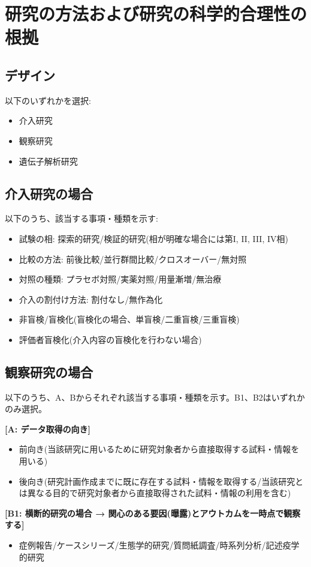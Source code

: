 \documentclass{kyodai-protocol}
\begin{document}
\section{研究の方法および研究の科学的合理性の根拠}
\label{sec:methods}

\subsection{デザイン}

以下のいずれかを選択:
\begin{itemize}
\item 介入研究
\item 観察研究
\item 遺伝子解析研究
\end{itemize}

\subsection{介入研究の場合}
以下のうち、該当する事項・種類を示す:
\begin{itemize}
\item 試験の相: 探索的研究/検証的研究(相が明確な場合には第I, II, III, IV相)
\item 比較の方法: 前後比較/並行群間比較/クロスオーバー/無対照
\item 対照の種類: プラセボ対照/実薬対照/用量漸増/無治療
\item 介入の割付け方法: 割付なし/無作為化
\item 非盲検/盲検化(盲検化の場合、単盲検/二重盲検/三重盲検)
\item 評価者盲検化(介入内容の盲検化を行わない場合)
\end{itemize}

\subsection{観察研究の場合}
以下のうち、A、Bからそれぞれ該当する事項・種類を示す。B1、B2はいずれかのみ選択。

\textbf{[A: データ取得の向き]}
\begin{itemize}
\item 前向き(当該研究に用いるために研究対象者から直接取得する試料・情報を用いる)
\item 後向き(研究計画作成までに既に存在する試料・情報を取得する/当該研究とは異なる目的で研究対象者から直接取得された試料・情報の利用を含む)
\end{itemize}

\textbf{[B1: 横断的研究の場合 → 関心のある要因(曝露)とアウトカムを一時点で観察する]}
\begin{itemize}
\item 症例報告/ケースシリーズ/生態学的研究/質問紙調査/時系列分析/記述疫学的研究
\end{itemize}
\end{document}
